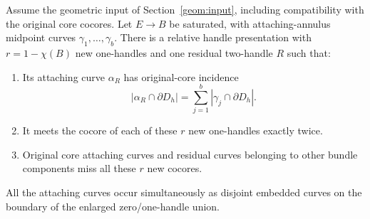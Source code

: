 \begin{theorem}
\label{geom:thm-residual-incidence}
Assume the geometric input of Section~\ref{geom:input}, including
compatibility with the original core cocores.  Let $E\to B$ be saturated,
with attaching-annulus midpoint curves $\gamma_1,\ldots,\gamma_b$.
There is a relative handle presentation with $r=1-\chi(B)$ new
one-handles and one residual two-handle $R$ such that:
\begin{enumerate}
\item Its attaching curve $\alpha_R$ has original-core incidence
\begin{equation}
 |\alpha_R\cap\partial D_h|
 =\sum_{j=1}^{b}|\gamma_j\cap\partial D_h|.
 \label{geom:eq-residual-row}
\end{equation}
\item It meets the cocore of each of these $r$ new one-handles exactly
twice.
\item Original core attaching curves and residual curves belonging to
other bundle components miss all these $r$ new cocores.
\end{enumerate}
All the attaching curves occur simultaneously as disjoint embedded
curves on the boundary of the enlarged zero/one-handle union.
\end{theorem}


